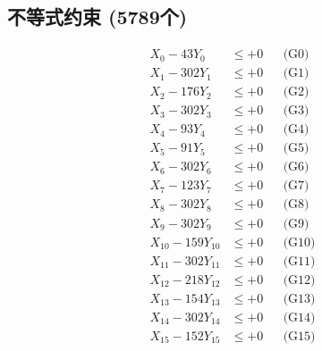 \documentclass[a4paper,10pt]{article}
\begin{document}
\subsection{不等式约束 (5789个)}

\allowdisplaybreaks
{\small
\begin{align}
\allowbreak
\allowbreak
\allowbreak
\allowbreak
\allowbreak
\allowbreak
\allowbreak
\allowbreak
\allowbreak
\allowbreak
\allowbreak
\allowbreak
\allowbreak
\allowbreak
\allowbreak
\allowbreak
\allowbreak
\allowbreak
\allowbreak
\allowbreak
\allowbreak
\allowbreak
\allowbreak
\allowbreak
\allowbreak
\allowbreak
\allowbreak
\allowbreak
\allowbreak
\allowbreak
\allowbreak
\allowbreak
\allowbreak
\allowbreak
\allowbreak
\allowbreak
\allowbreak
\allowbreak
\allowbreak
\allowbreak
\allowbreak
\allowbreak
\allowbreak
\allowbreak
\allowbreak
\allowbreak
\allowbreak
\allowbreak
\allowbreak
\allowbreak
\allowbreak
\allowbreak
\allowbreak
\allowbreak
\allowbreak
\allowbreak
\allowbreak
\allowbreak
\allowbreak
\allowbreak
\allowbreak
\allowbreak
\allowbreak
\allowbreak
\allowbreak
\allowbreak
\allowbreak
\allowbreak
\allowbreak
\allowbreak
\allowbreak
\allowbreak
\allowbreak
\allowbreak
\allowbreak
\allowbreak
\allowbreak
\allowbreak
X_{0} - 43Y_{0} &\leq +0 && \text{(G0)} \\
\allowbreak
X_{1} - 302Y_{1} &\leq +0 && \text{(G1)} \\
X_{2} - 176Y_{2} &\leq +0 && \text{(G2)} \\
X_{3} - 302Y_{3} &\leq +0 && \text{(G3)} \\
X_{4} - 93Y_{4} &\leq +0 && \text{(G4)} \\
X_{5} - 91Y_{5} &\leq +0 && \text{(G5)} \\
X_{6} - 302Y_{6} &\leq +0 && \text{(G6)} \\
X_{7} - 123Y_{7} &\leq +0 && \text{(G7)} \\
X_{8} - 302Y_{8} &\leq +0 && \text{(G8)} \\
X_{9} - 302Y_{9} &\leq +0 && \text{(G9)} \\
X_{10} - 159Y_{10} &\leq +0 && \text{(G10)} \\
\allowbreak
X_{11} - 302Y_{11} &\leq +0 && \text{(G11)} \\
X_{12} - 218Y_{12} &\leq +0 && \text{(G12)} \\
X_{13} - 154Y_{13} &\leq +0 && \text{(G13)} \\
X_{14} - 302Y_{14} &\leq +0 && \text{(G14)} \\
X_{15} - 152Y_{15} &\leq +0 && \text{(G15)} \\

\end{align}}
\end{document}
